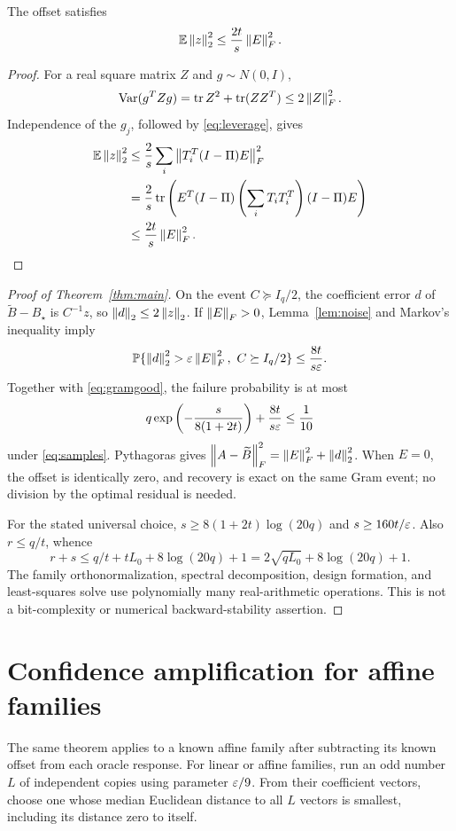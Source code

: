 \documentclass[11pt]{article}
\begin{document}
\begin{lemma}\label{lem:noise}
The offset satisfies
\[
 \mathbb E\left\lVert z\right\rVert_2^2\le\frac{2t}{s}\left\lVert E\right\rVert_F^2.
\]
\end{lemma}
\begin{proof}
For a real square matrix $Z$ and $g\sim N(0,I)$,
\[
 \operatorname{Var}(g^TZg)=\operatorname{tr} Z^2+\operatorname{tr}(ZZ^T)\le2\left\lVert Z\right\rVert_F^2.
\]
Independence of the $g_j$, followed by \eqref{eq:leverage}, gives
\begin{align*}
 \mathbb E\left\lVert z\right\rVert_2^2
 &\le\frac2s\sum_i\left\lVert T_i^T(I-\Pi)E\right\rVert_F^2\\
 &=\frac2s\operatorname{tr}\left(E^T(I-\Pi)
                  \left(\sum_iT_iT_i^T\right)(I-\Pi)E\right)\\
 &\le\frac{2t}{s}\left\lVert E\right\rVert_F^2.
\end{align*}
\end{proof}

\begin{proof}[Proof of Theorem~\ref{thm:main}]
On the event $C\succeq I_q/2$, the coefficient error $d$ of $\widetilde B-B_\star$ is $C^{-1}z$, so $\left\lVert d\right\rVert_2\le2\left\lVert z\right\rVert_2$. If $\left\lVert E\right\rVert_F>0$, Lemma~\ref{lem:noise} and Markov's inequality imply
\[
 \mathbb P\{\left\lVert d\right\rVert_2^2>\varepsilon\left\lVert E\right\rVert_F^2,\ C\succeq I_q/2\}
 \le\frac{8t}{s\varepsilon}.
\]
Together with \eqref{eq:gramgood}, the failure probability is at most
\[
 q\exp\left(-\frac{s}{8(1+2t)}\right)+\frac{8t}{s\varepsilon}\le\frac1{10}
\]
under \eqref{eq:samples}. Pythagoras gives
$\left\lVert A-\widetilde B\right\rVert_F^2=\left\lVert E\right\rVert_F^2+\left\lVert d\right\rVert_2^2$.
When $E=0$, the offset is identically zero, and recovery is exact on the same Gram event; no division by the optimal residual is needed.

For the stated universal choice, $s\ge8(1+2t)\log(20q)$ and $s\ge160t/\varepsilon$. Also $r\le q/t$, whence
\[
 r+s\le q/t+tL_0+8\log(20q)+1
       =2\sqrt{qL_0}+8\log(20q)+1.
\]
The family orthonormalization, spectral decomposition, design formation, and least-squares solve use polynomially many real-arithmetic operations. This is not a bit-complexity or numerical backward-stability assertion.
\end{proof}

\section{Confidence amplification for affine families}
The same theorem applies to a known affine family after subtracting its known offset from each oracle response. For linear or affine families, run an odd number $L$ of independent copies using parameter $\varepsilon/9$. From their coefficient vectors, choose one whose median Euclidean distance to all $L$ vectors is smallest, including its distance zero to itself.
\end{document}
